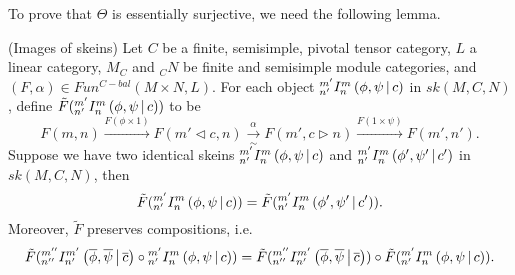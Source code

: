 \noindent To prove that $\Theta$ is essentially surjective, we need the following
lemma.

\begin{lemma} (Images of skeins) \label{lemma/image-of-skein}
  \noindent
  Let $C$ be a finite, semisimple, pivotal tensor category, $L$ a linear
  category, $M_{C}$ and $_{C}N$ be finite and semisimple module categories,
  and $(F,\alpha) \in Fun^{C-bal}(M \times N, L)$. For each object
  ${}^{m'}_{n'} I^{m}_{n} \left( \phi, \psi \,\middle|\, c \right)$ in $sk(M,C,N)$, define
  $\tilde{F}({}^{m'}_{n'} I^{m}_{n} \left( \phi, \psi \,\middle|\, c \right))$ to be
  \[
    F(m,n)
    \xrightarrow{F(\phi \times 1)}
    F(m' \lhd c, n)
    \xrightarrow[\sim]{\alpha}
    F(m', c \rhd n)
    \xrightarrow{F(1 \times \psi)}
    F(m',n').
  \]
  Suppose we have two identical skeins ${}^{m'}_{n'} I^{m}_{n} \left( \phi, \psi \,\middle|\, c \right)$ and $ {}^{m'}_{n'} I^{m}_{n} \left( \phi', \psi' \,\middle|\, c' \right)$ in
  $sk(M,C,N)$, then
  \[
    \tilde{F}({}^{m'}_{n'} I^{m}_{n} \left( \phi, \psi \,\middle|\, c \right)) = \tilde{F}({}^{m'}_{n'} I^{m}_{n} \left( \phi', \psi' \,\middle|\, c' \right)).
  \]
  Moreover, $\tilde{F}$ preserves compositions, i.e.
  \[
    \tilde{F}({}^{m''}_{n''} I^{m'}_{n'} \left( \overline{\phi}, \overline{\psi} \,\middle|\, \overline{c} \right) \circ {}^{m'}_{n'} I^{m}_{n} \left( \phi, \psi \,\middle|\, c \right))
    = \tilde{F}({}^{m''}_{n''} I^{m'}_{n'} \left( \overline{\phi}, \overline{\psi} \,\middle|\, \overline{c} \right))
    \circ
    \tilde{F}({}^{m'}_{n'} I^{m}_{n} \left( \phi, \psi \,\middle|\, c \right)).
  \]
\end{lemma}

